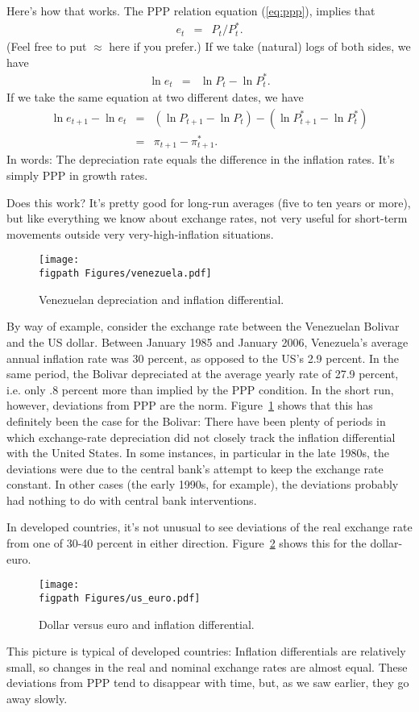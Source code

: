 Here's how that works.
The PPP relation  equation (\ref{eq:ppp}), implies that
\begin{eqnarray*}
    e_t &=& P_t/P_t^* .
\end{eqnarray*}
(Feel free to put $\approx$ here if you prefer.)
If we take (natural) logs of both sides, we have
\begin{eqnarray*}
    \ln e_t &=& \ln P_t - \ln P_t^* .
\end{eqnarray*}
If we take the same equation at two different dates,
we have
\begin{eqnarray*}
    \ln e_{t+1}-\ln e_{t} &=&
        (\ln P_{t+1}-\ln P_{t}) - (\ln P^{*}_{t+1}-\ln P^{*}_{t}) \\
                &=& \pi_{t+1} - \pi^*_{t+1} .
\end{eqnarray*}
In words:  The depreciation rate equals the difference in the inflation rates.
It's simply PPP in growth rates.


Does this work?
It's pretty good for long-run averages (five to ten years or more),
but like everything we know about exchange rates,
not very useful for short-term movements outside very
very-high-inflation situations.

\begin{figure}[h]
    \caption{Venezuelan depreciation and inflation differential.}
    \label{fig:venezuela}
    \centering
    \texttt{[image: \\figpath Figures/venezuela.pdf]}
\end{figure}

By way of example, consider the exchange rate between the Venezuelan
Bolivar and the US dollar. Between January 1985 and January 2006,
Venezuela's average annual inflation rate was 30 percent, as opposed to
the US's 2.9 percent. In the same period, the Bolivar
depreciated at the average yearly rate of 27.9 percent, i.e. only .8 percent
more than implied by the PPP condition. In the short run, however,
deviations from PPP are the norm.
Figure~\ref{fig:venezuela} shows that this has definitely been the
case for the Bolivar: There have been plenty of periods in which
exchange-rate depreciation did not closely track the inflation
differential with the United States. In some instances, in
particular in the late 1980s, the deviations were due to the central
bank's attempt to keep the exchange rate constant.
In other cases (the early 1990s, for example), the deviations
probably had nothing to do with central bank  interventions.

%
In developed countries, it's not unusual to see deviations of
the real exchange rate from one of 30-40 percent in either direction.
Figure~\ref{fig:us_euro} shows this for the dollar-euro.
\begin{figure}[h]
    \caption{Dollar versus euro and inflation differential.}
    \label{fig:us_euro}
    \centering
    \texttt{[image: \\figpath Figures/us\_euro.pdf]}
\end{figure}
%
This picture is typical of developed countries: Inflation differentials are relatively small,
so changes in the real and nominal exchange rates are almost equal.
These deviations from PPP tend to disappear with time,
but, as we saw earlier, they go away slowly.


